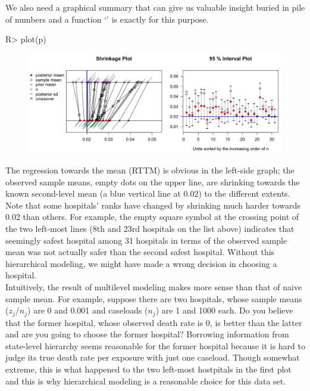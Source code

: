 \documentclass[article]{jss}
\begin{document}
We also need a graphical summary that can give us valuable insight buried in pile of numbers and a function `' is exactly for this purpose.
\begin{CodeChunk}
\begin{CodeInput}
R> plot(p)
\end{CodeInput}
\end{CodeChunk}
\begin{figure}[h]
\begin{center}
\includegraphics[scale=0.25]{hospital1.png}
\end{center}
\end{figure}

The regression towards the mean (RTTM) is obvious in the left-side graph; the observed sample means, empty dots on the upper line, are shrinking towards the known second-level mean (a blue vertical line at 0.02) to the different extents. Note that some hospitals' ranks have changed by shrinking much harder towards 0.02 than others. For example, the empty square symbol at the crossing point of the two left-most lines (8th and 23rd hospitals on the list above) indicates that seemingly safest hospital among 31 hospitals in terms of the observed sample mean was not actually safer than the second safest hospital. Without this hierarchical modeling, we might have made a wrong decision in choosing a hospital.
\\

Intuitively, the result of multilevel modeling makes more sense than that of naive sample mean. For example, suppose there are two hospitals, whose sample means ($z_{j} / n_{j}$) are 0 and 0.001 and caseloads ($n_{j}$) are 1 and 1000 each. Do you believe that the former hospital, whose observed death rate is 0, is better than the latter and are you going to choose the former hospital? Borrowing information from state-level hierarchy seems reasonable for the former hospital because it is hard to judge its true death rate per exposure with just one caseload. Though somewhat extreme, this is what happened to the two left-most hostpitals in the first plot and this is why hierarchical modeling is a reasonable choice for this data set.
\\
\end{document}

